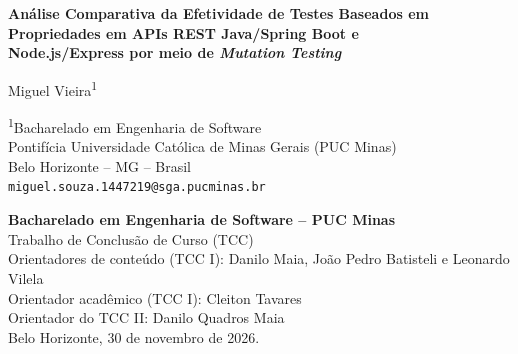 \documentclass[12pt,a4paper]{article}
\begin{document}
\begin{center}
  {\Large\bfseries Análise Comparativa da Efetividade de Testes Baseados em\\
  Propriedades em APIs REST Java/Spring Boot e\\
  Node.js/Express por meio de \textit{Mutation Testing}\par}
  \vspace{12pt}
  {\large Miguel Vieira\textsuperscript{1}\par}
  \vspace{6pt}
  {\small \textsuperscript{1}Bacharelado em Engenharia de Software\\
  Pontifícia Universidade Católica de Minas Gerais (PUC Minas)\\
  Belo Horizonte -- MG -- Brasil\\
  \texttt{miguel.souza.1447219@sga.pucminas.br}\par}
\end{center}



\vspace{6pt}
\noindent\begin{minipage}{\textwidth}\small
\textbf{Bacharelado em Engenharia de Software -- PUC Minas}\\
Trabalho de Conclusão de Curso (TCC)\\
Orientadores de conteúdo (TCC I): Danilo Maia, João Pedro Batisteli e Leonardo Vilela\\
Orientador acadêmico (TCC I): Cleiton Tavares\\
Orientador do TCC II: Danilo Quadros Maia\\
Belo Horizonte, 30 de novembro de 2026.
\end{minipage}













\clearpage

\end{document}
